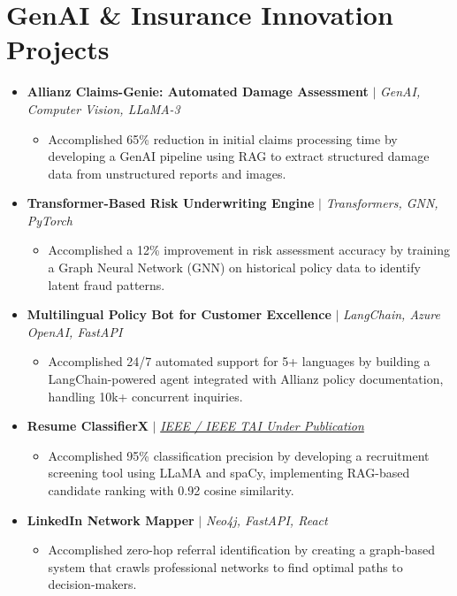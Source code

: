 \documentclass[10pt,a4paper]{article}
\newcommand{\resumeItem}[1]{\item\small{#1}}
\begin{document}
\section{GenAI \& Insurance Innovation Projects}
\begin{itemize}[label={}]
    \item \textbf{Allianz Claims-Genie: Automated Damage Assessment} $|$ \emph{GenAI, Computer Vision, LLaMA-3}
    \begin{itemize}
        \resumeItem{Accomplished 65\% reduction in initial claims processing time by developing a GenAI pipeline using RAG to extract structured damage data from unstructured reports and images.}
    \end{itemize}

    \item \textbf{Transformer-Based Risk Underwriting Engine} $|$ \emph{Transformers, GNN, PyTorch}
    \begin{itemize}
        \resumeItem{Accomplished a 12\% improvement in risk assessment accuracy by training a Graph Neural Network (GNN) on historical policy data to identify latent fraud patterns.}
    \end{itemize}

    \item \textbf{Multilingual Policy Bot for Customer Excellence} $|$ \emph{LangChain, Azure OpenAI, FastAPI}
    \begin{itemize}
        \resumeItem{Accomplished 24/7 automated support for 5+ languages by building a LangChain-powered agent integrated with Allianz policy documentation, handling 10k+ concurrent inquiries.}
    \end{itemize}

    \item \textbf{Resume ClassifierX} $|$ \emph{\href{https://github.com/KartavyaDikshit}{IEEE / IEEE TAI Under Publication}}
    \begin{itemize}
        \resumeItem{Accomplished 95\% classification precision by developing a recruitment screening tool using LLaMA and spaCy, implementing RAG-based candidate ranking with 0.92 cosine similarity.}
    \end{itemize}

    \item \textbf{LinkedIn Network Mapper} $|$ \emph{Neo4j, FastAPI, React}
    \begin{itemize}
        \resumeItem{Accomplished zero-hop referral identification by creating a graph-based system that crawls professional networks to find optimal paths to decision-makers.}
    \end{itemize}
\end{itemize}
\end{document}
